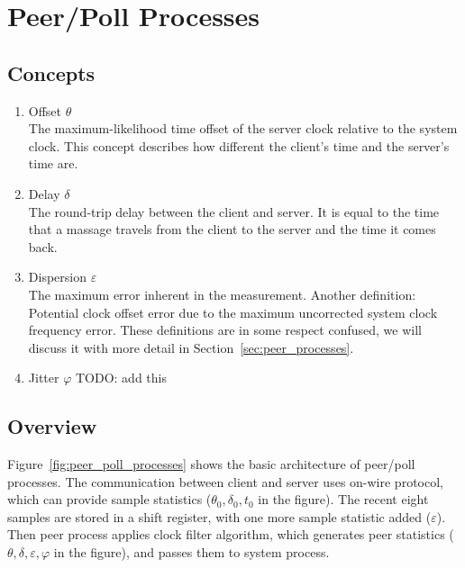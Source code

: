 \chapter{Peer/Poll Processes}
\label{cha:peer/poll_processes}

\section{Concepts}%
\label{sec:peer/poll_concepts}
\begin{enumerate}
    \item Offset $\theta$\\
        The maximum-likelihood time offset of the server clock relative to the
        system clock. This concept describes how different the client's time
        and the server's time are.
    \item Delay $\delta$\\
        The round-trip delay between the client and server. It is equal to the
        time that a massage travels from the client to the server and the time
        it comes back.
    \item Dispersion $\varepsilon$\\
        The maximum error inherent in the measurement.
        Another definition: Potential clock offset error due to the maximum
        uncorrected system clock frequency error.
        These definitions are in some respect confused, we will discuss it with
        more detail in Section~\ref{sec:peer_processes}.
    \item Jitter $\varphi$
        TODO: add this
\end{enumerate}

\section{Overview}%
\label{sec:peer_poll_overview}
Figure~\ref{fig:peer_poll_processes} shows the basic architecture of peer/poll
processes. The communication between client and server uses on-wire protocol,
which can provide sample statistics ($\theta_0, \delta_0, t_0$ in the figure).
The recent eight samples are stored in a shift register, with one more sample
statistic added ($\varepsilon$).  Then peer process applies clock filter
algorithm, which generates peer statistics ($\theta, \delta, \varepsilon,
\varphi$ in the figure), and passes them to system process.

